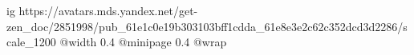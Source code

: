  
 
 
 
 

\ifcmt
  ig https://avatars.mds.yandex.net/get-zen_doc/2851998/pub_61e1c0e19b303103bff1cdda_61e8e3e2c62c352dcd3d2286/scale_1200
  @width 0.4
  @minipage 0.4
  @wrap \parpic[r]
\fi
